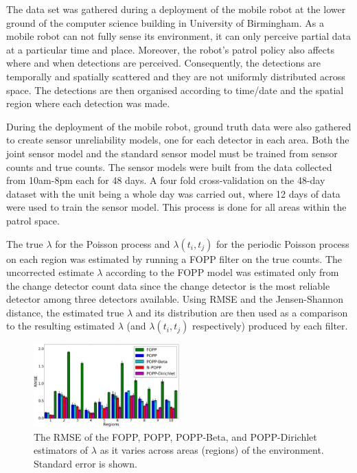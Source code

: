 The data set was gathered during a deployment of the mobile robot at the lower ground of the computer science building in University of Birmingham. As a mobile robot can not fully sense its environment, it can only perceive partial data at a particular time and place. Moreover, the robot's patrol policy also affects where and when detections are perceived. Consequently, the detections are temporally and spatially scattered and they are not uniformly distributed across space. The detections are then organised according to time/date and the spatial region where each detection was made.

During the deployment of the mobile robot, ground truth data were also gathered to create sensor unreliability models, one for each detector in each area. Both the joint sensor model and the standard sensor model must be trained from sensor counts and true counts. The sensor models were built from the data collected from 10am-8pm each for 48 days. A four fold cross-validation on the 48-day dataset with the unit being a whole day was carried out, where 12 days of data were used to train the sensor model. This process is done for all areas within the patrol space.

The true $\lambda$ for the Poisson process and $\lambda(t_i, t_j)$ for the periodic Poisson process on each region was estimated by running a FOPP filter on the true counts. The uncorrected estimate $\lambda$ according to the FOPP model was estimated only from the change detector count data since the change detector is the most reliable detector among three detectors available. Using RMSE and the Jensen-Shannon distance, the estimated true $\lambda$ and its distribution are then used as a comparison to the resulting estimated $\lambda$ (and $\lambda(t_i, t_j)$ respectively) produced by each filter.

\begin{figure}[t!]
	\centering
	\includegraphics[width=0.5\textwidth]{./figures/rmse_across_region_popp_dirichlet.png}
    \caption{The RMSE of the FOPP, POPP, POPP-Beta, and POPP-Dirichlet estimators of $\lambda$ as it varies across areas (regions) of the environment. Standard error is shown.}
    \label{fig:rmse_across_region_popp_dirichlet}
\end{figure}

